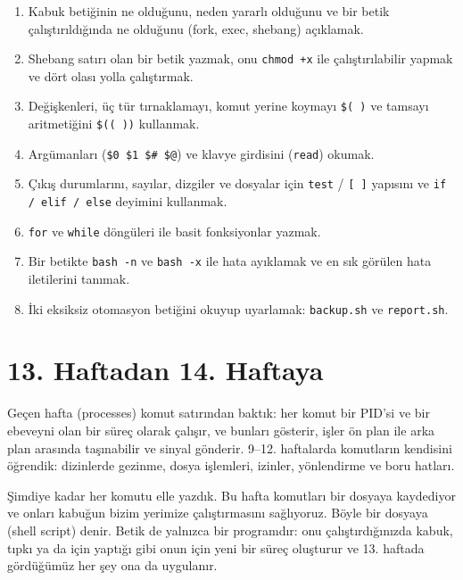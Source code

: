 \vspace{0.8em}
\begin{keyidea}
\begin{enumerate}[leftmargin=1.4em]
  \item Kabuk betiğinin ne olduğunu, neden yararlı olduğunu ve bir betik çalıştırıldığında ne olduğunu (fork, exec, shebang) açıklamak.
  \item Shebang satırı olan bir betik yazmak, onu \texttt{chmod +x} ile çalıştırılabilir yapmak ve dört olası yolla çalıştırmak.
  \item Değişkenleri, üç tür tırnaklamayı, komut yerine koymayı \texttt{\$( )} ve tamsayı aritmetiğini \texttt{\$(( ))} kullanmak.
  \item Argümanları (\texttt{\$0 \$1 \$\# \$@}) ve klavye girdisini (\texttt{read}) okumak.
  \item Çıkış durumlarını, sayılar, dizgiler ve dosyalar için \texttt{test} / \texttt{[ ]} yapısını ve \texttt{if / elif / else} deyimini kullanmak.
  \item \texttt{for} ve \texttt{while} döngüleri ile basit fonksiyonlar yazmak.
  \item Bir betikte \texttt{bash -n} ve \texttt{bash -x} ile hata ayıklamak ve en sık görülen hata iletilerini tanımak.
  \item İki eksiksiz otomasyon betiğini okuyup uyarlamak: \texttt{backup.sh} ve \texttt{report.sh}.
\end{enumerate}
\end{keyidea}

\setcounter{tocdepth}{1}
\tableofcontents

\section{13. Haftadan 14. Haftaya}

Geçen hafta  (processes) komut satırından baktık: her komut bir PID'si ve bir ebeveyni olan bir süreç olarak çalışır,  ve  bunları gösterir, işler ön plan ile arka plan arasında taşınabilir ve  sinyal gönderir. 9--12. haftalarda komutların kendisini öğrendik: dizinlerde gezinme, dosya işlemleri, izinler, yönlendirme ve boru hatları.

Şimdiye kadar her komutu elle yazdık. Bu hafta komutları bir dosyaya kaydediyor ve onları kabuğun bizim yerimize çalıştırmasını sağlıyoruz. Böyle bir dosyaya  (shell script) denir. Betik de yalnızca bir programdır: onu çalıştırdığınızda kabuk, tıpkı  ya da  için yaptığı gibi onun için yeni bir süreç oluşturur ve 13. haftada gördüğümüz her şey ona da uygulanır.

